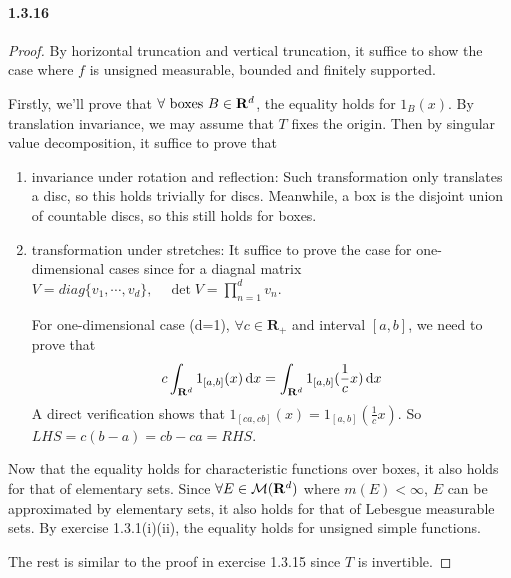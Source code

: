 \documentclass{article}
\begin{document}
\paragraph{1.3.16}
\begin{proof}
By horizontal truncation and vertical truncation, it suffice to show the case where $f$ is unsigned measurable, bounded and finitely supported.

Firstly, we'll prove that $\forall \text{ boxes } B\in\mathbf{R}^d$, the equality holds for $1_B(x)$. By translation invariance, we may assume that $T$ fixes the origin. Then by singular value decomposition, it suffice to prove that 
\begin{enumerate}
\item {invariance under rotation and reflection:} Such transformation only translates a disc, so this holds trivially for discs. Meanwhile, a box is the disjoint union of countable discs, so this still holds for boxes.
\item {transformation under stretches:} It suffice to prove the case for one-dimensional cases since for a diagnal matrix $V=diag\{v_1,\cdots,v_d\},\quad\det{V}=\prod\limits_{n=1}^{d}v_n$. 

For one-dimensional case (d=1), $\forall c\in \mathbf{R}_+$ and interval $[a,b]$, we need to prove that 
\[c\int_{\mathbf{R}^d} 1_{[a,b]}(x)\,\mathrm{d} x=\int_{\mathbf{R}^d} 1_{[a,b]}(\frac 1 c x)\,\mathrm{d} x\]
A direct verification shows that $1_{[ca,cb]}(x)=1_{[a,b]}(\frac 1 c x)$. So $LHS=c(b-a)=cb-ca=RHS$.
\end{enumerate} 
Now that the equality holds for characteristic functions over boxes, it also holds for that of elementary sets. Since $\forall E\in \mathcal{M}(\mathbf{R}^d)$ where $m(E)<\infty$, $E$ can be approximated by elementary sets, it also holds for that of Lebesgue measurable sets. By exercise 1.3.1(i)(ii), the equality holds for unsigned simple functions.

The rest is similar to the proof in exercise 1.3.15 since $T$ is invertible.
\end{proof}
\end{document}

